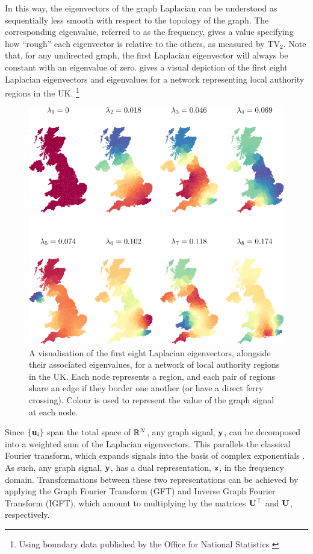 \newpage

In this way, the eigenvectors of the graph Laplacian can be understood as sequentially less smooth with respect to the topology of the graph. The corresponding eigenvalue, referred to as the frequency, gives a value specifying how ``rough'' each eigenvector is relative to the others, as measured by $\text{TV}_2$. Note that, for any undirected graph, the first Laplacian eigenvector will always be constant with an eigenvalue of zero.  gives a visual depiction of the first eight Laplacian eigenvectors and eigenvalues for a network representing local authority regions in the UK. \footnote{Using boundary data published by the Office for National Statistics \citep{ONS2019}}  

\begin{figure}[t]
	\centering
		\includegraphics[width=0.85\linewidth]{Figures/uk_plot.pdf}
        \caption[A visualisation of the Laplacian eigenvectors for a network of regions in the UK]{A visualisation of the first eight Laplacian eigenvectors, alongside their associated eigenvalues, for a network of local authority regions in the UK. Each node represents a region, and each pair of regions share an edge if they border one another (or have a direct ferry crossing). Colour is used to represent the value of the graph signal at each node.  }
	\label{fig:uk_eigs}
\end{figure}


Since $\{\mathbf{u}_i\}$ span the total space of $\mathbb{R}^N$, any graph signal, $\mathbf{y}$, can be decomposed into a weighted sum of the Laplacian eigenvectors. This parallels the classical Fourier transform, which expands signals into the basis of complex exponentials \citep{Sneddon1995}. As such, any graph signal, $\mathbf{y}$, has a dual representation, $\mathbf{z}$, in the frequency domain. Transformations between these two representations can be achieved by applying the Graph Fourier Transform (GFT) and Inverse Graph Fourier Transform (IGFT), which amount to multiplying by the matrices $\mathbf{U}^\top$ and $\mathbf{U}$, respectively.

